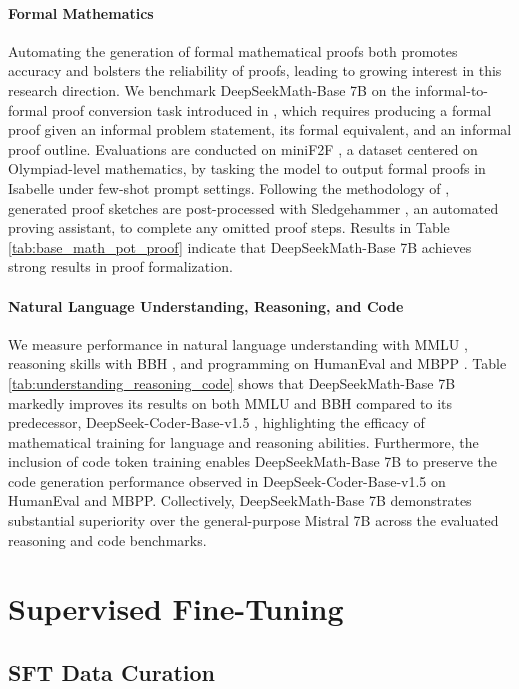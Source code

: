 \paragraph{Formal Mathematics}

Automating the generation of formal mathematical proofs both promotes accuracy and bolsters the reliability of proofs, leading to growing interest in this research direction. We benchmark DeepSeekMath-Base 7B on the informal-to-formal proof conversion task introduced in \citep{dsp_proof}, which requires producing a formal proof given an informal problem statement, its formal equivalent, and an informal proof outline. Evaluations are conducted on miniF2F \citep{minif2f}, a dataset centered on Olympiad-level mathematics, by tasking the model to output formal proofs in Isabelle under few-shot prompt settings. Following the methodology of \cite{dsp_proof}, generated proof sketches are post-processed with Sledgehammer \citep{sledgehammer}, an automated proving assistant, to complete any omitted proof steps. Results in Table \ref{tab:base_math_pot_proof} indicate that DeepSeekMath-Base 7B achieves strong results in proof formalization.

\paragraph{Natural Language Understanding, Reasoning, and Code}

We measure performance in natural language understanding with MMLU \citep{mmlu}, reasoning skills with BBH \citep{bbh}, and programming on HumanEval \citep{codex} and MBPP \citep{mbpp}. Table \ref{tab:understanding_reasoning_code} shows that DeepSeekMath-Base 7B markedly improves its results on both MMLU and BBH compared to its predecessor, DeepSeek-Coder-Base-v1.5 \citep{deepseek-coder}, highlighting the efficacy of mathematical training for language and reasoning abilities. Furthermore, the inclusion of code token training enables DeepSeekMath-Base 7B to preserve the code generation performance observed in DeepSeek-Coder-Base-v1.5 on HumanEval and MBPP. Collectively, DeepSeekMath-Base 7B demonstrates substantial superiority over the general-purpose Mistral 7B \citep{mistral} across the evaluated reasoning and code benchmarks.

\section{Supervised Fine-Tuning}

\subsection{SFT Data Curation}

